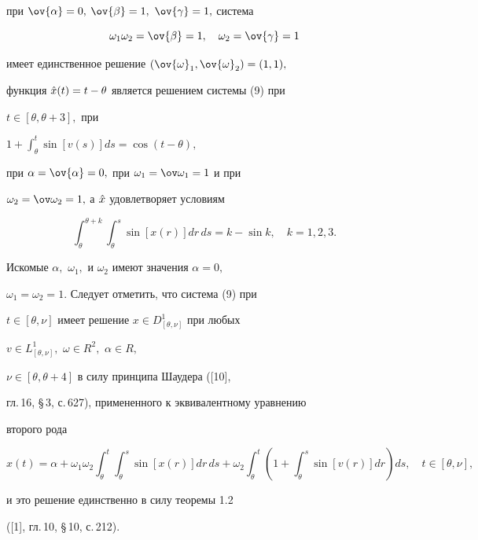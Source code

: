 \begin{exam}
при $\ov{\alpha}=0,$ $\ov{\beta} = 1,$ $\ov{\gamma}=1,$ система


$$


\omega_1 \omega_2 = \ov{\beta} = 1,\quad


\omega_2 = \ov{\gamma} = 1


$$


имеет единственное решение $(\ov{\omega}_1,\ov{\omega}_2) = (1,1),$


функция $\Hat{x}(t)=t-\theta$ является решением системы (9) при


$t\in[\theta,\theta+3],$ при


${\displaystyle 1 + \int_{\theta}^t\sin[v(s)]ds = \cos(t-\theta),}$


при $\alpha=\ov{\alpha}=0,$ при $\omega_1=\ov\omega_1=1$ и при


$\omega_2=\ov\omega_2=1,$ а $\Hat{x}$ удовлетворяет условиям


$$


\int_{\theta}^{\theta+k}\int_{\theta}^s\sin [x(r)]dr\,ds =


k-\sin k,\quad k=1, 2, 3.


$$


Искомые $\alpha,$ $\omega_1,$ и $\omega_2$ имеют значения $\alpha=0,$


$\omega_1=\omega_2=1.$ Следует отметить, что система (9) при


$t\in[\theta,\nu]$ имеет решение $x\in D^1_{[\theta,\nu]}$ при любых


$v\in L^1_{[\theta,\nu]},$ $\omega\in R^2,$ $\alpha\in R,$


$\nu\in[\theta,\theta+4]$ в силу принципа Шаудера ([10],


гл.\,16, \S\,3, с.\,627), примененного к эквивалентному уравнению


второго рода


$$


x(t) = \alpha + \omega_1\omega_2 \int_{\theta}^t\int_{\theta}^s


\sin [x(r)]dr\,ds + \omega_2 \int_{\theta}^t(1+\int_{\theta}^s


\sin[v(r)]dr)ds,\quad t\in[\theta,\nu],


$$


и это решение единственно в силу теоремы 1.2


([1], гл.\,10, \S\,10, с.\,212).


\end{exam}





